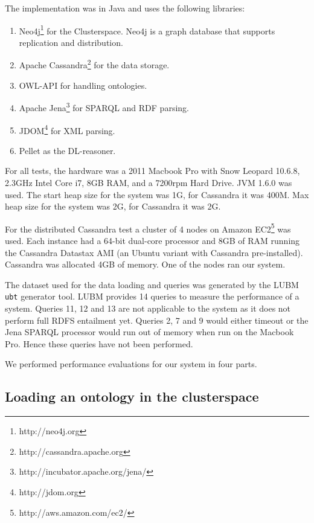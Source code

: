 \documentclass[journal]{IEEEtran}
\begin{document}
The implementation was in Java and uses the following libraries:
\begin{enumerate}
    \item Neo4j\footnote{http://neo4j.org} for the Clusterspace. Neo4j is
        a graph database that supports replication and distribution.

    \item Apache Cassandra\footnote{http://cassandra.apache.org} for the data
        storage.

    \item OWL-API\cite{Hor:09} for handling ontologies.

    \item Apache Jena\footnote{http://incubator.apache.org/jena/} for SPARQL
        and RDF parsing.

    \item JDOM\footnote{http://jdom.org} for XML parsing.

    \item Pellet\cite{Parsia04pellet:an} as the DL-reasoner.
\end{enumerate}

For all tests, the hardware was a 2011 Macbook Pro with Snow Leopard 10.6.8,
2.3GHz Intel Core i7, 8GB RAM, and a 7200rpm Hard Drive.  JVM 1.6.0 was used.
The start heap size for the system was 1G, for Cassandra it was 400M. Max
heap size for the system was 2G, for Cassandra it was 2G.

For the distributed Cassandra test a cluster of 4 nodes on Amazon
EC2\footnote{http://aws.amazon.com/ec2/} was used.  Each instance had a 64-bit
dual-core processor and 8GB of RAM running the Cassandra Datastax AMI (an
Ubuntu variant with Cassandra pre-installed).  Cassandra was allocated 4GB of
memory. One of the nodes ran our system.

The dataset used for the data loading and queries was generated by the
LUBM \texttt{ubt} generator tool. LUBM provides 14 queries to
measure the performance of a system. Queries 11, 12 and 13 are not applicable
to the system as it does not perform full RDFS entailment yet. Queries 2, 7 and
9 would either timeout or the Jena SPARQL processor would run out of memory
when run on the Macbook Pro. Hence these queries have not been performed.

We performed performance evaluations for our system in four parts.

\subsection{Loading an ontology in the clusterspace}
\end{document}

